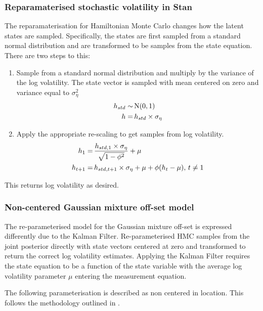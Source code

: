 \documentclass[12pt, a4paper]{article}
\begin{document}
        \subsubsection{Reparamaterised stochastic volatility in Stan}
        The reparamaterisation for Hamiltonian Monte Carlo changes how the latent states are sampled. Specifically, the states are first sampled from a standard normal distribution and are transformed to be samples from the state equation. There are two steps to this:
        \begin{enumerate}
            
        \item Sample from a standard normal distribution and multiply by the variance of the log volatility. The state vector is sampled with mean centered on zero and variance equal to $\sigma_{\eta}^2$
        \begin{align}
        h_{std} \sim&\space \,\mathrm{N}(0,1) \\
        h =& \space \, h_{std} \times \sigma_{\eta}
        \end{align}
        \item Apply the appropriate re-scaling to get samples from log volatility. 
        \begin{align}
        h_1 =& \space \,\frac{h_{std, 1}\times \sigma_{\eta}} {\sqrt{1 - \phi^2}} + \mu \\
        h_{t+1} =& \space \,h_{std, t+1}\times \sigma_{\eta} + \mu  + \phi(h_{t} - \mu),\space \, t\neq 1
        \end{align}
        \end{enumerate}
        This returns log volatility as desired.
        
        \subsubsection{Non-centered Gaussian mixture off-set model}
        The re-parameterised model for the Gaussian mixture off-set is expressed differently due to the Kalman Filter. Re-parameterised HMC samples from the joint posterior directly with state vectors centered at zero and transformed to return the correct log volatility estimates. Applying the Kalman Filter requires the state equation to be a function of the state variable with the average log volatility parameter $\mu$ entering the measurement equation.

        The following parameterisation is described as non centered in location. This follows the methodology outlined in \citet{strickland2008parameterisation}.
        
\end{document}
